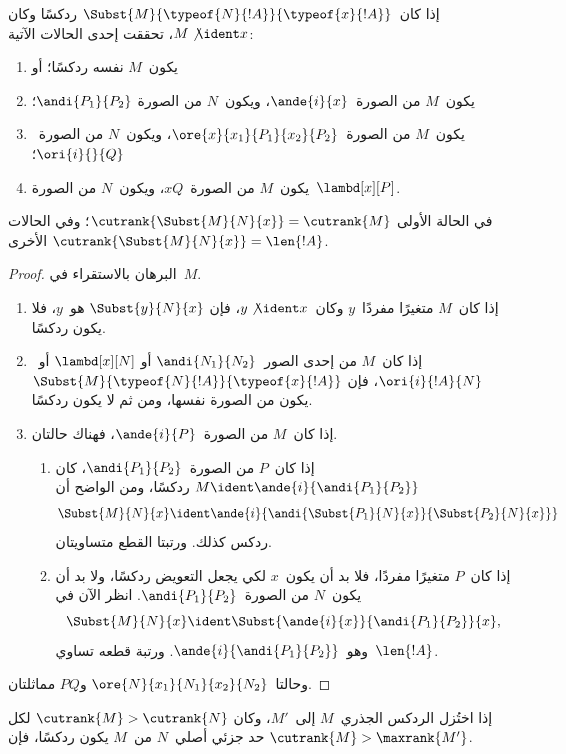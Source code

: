 \documentclass[../../../include/open-logic-section]{subfiles}
\begin{document}
\begin{lem}
  إذا كان~$\Subst{M}{\typeof{N}{!A}}{\typeof{x}{!A}}$ ردكسًا وكان
  $M\not\ident x$، تحققت إحدى الحالات الآتية:
  \begin{enumerate}
  \item يكون~$M$ نفسه ردكسًا؛ أو
  \item يكون~$M$ من الصورة~$\ande{i}{x}$، ويكون~$N$ من الصورة
    $\andi{P_1}{P_2}$؛
  \item يكون~$M$ من الصورة~$\ore{x}{x_1}{P_1}{x_2}{P_2}$، ويكون~$N$
    من الصورة~$\ori{i}{}{Q}$؛
  \item يكون~$M$ من الصورة~$xQ$، ويكون~$N$ من الصورة~$\lambd[x][P]$.
  \end{enumerate}
  في الحالة الأولى
  $\cutrank{\Subst{M}{N}{x}}=\cutrank{M}$؛ وفي الحالات الأخرى
  $\cutrank{\Subst{M}{N}{x}}=\len{!A}$.
\end{lem}
\begin{proof}
  البرهان بالاستقراء في~$M$.
  \begin{enumerate}
  \item إذا كان~$M$ متغيرًا مفردًا~$y$ وكان~$y\not\ident x$، فإن
    $\Subst{y}{N}{x}$ هو~$y$، فلا يكون ردكسًا.
  \item إذا كان~$M$ من إحدى الصور~$\andi{N_1}{N_2}$ أو
    $\lambd[x][N]$ أو~$\ori{i}{!A}{N}$، فإن
    $\Subst{M}{\typeof{N}{!A}}{\typeof{x}{!A}}$ يكون من الصورة نفسها،
    ومن ثم لا يكون ردكسًا.
  \item إذا كان~$M$ من الصورة~$\ande{i}{P}$، فهناك حالتان.
    \begin{enumerate}
      \item إذا كان~$P$ من الصورة~$\andi{P_1}{P_2}$، كان
        $M\ident\ande{i}{\andi{P_1}{P_2}}$ ردكسًا، ومن الواضح أن
        \[
        \Subst{M}{N}{x}\ident
        \ande{i}{\andi{\Subst{P_1}{N}{x}}{\Subst{P_2}{N}{x}}}
        \]
        ردكس كذلك. ورتبتا القطع متساويتان.
      \item إذا كان~$P$ متغيرًا مفردًا، فلا بد أن يكون~$x$ لكي يجعل
        التعويض ردكسًا، ولا بد أن يكون~$N$ من الصورة~$\andi{P_1}{P_2}$.
        انظر الآن في
        \[
        \Subst{M}{N}{x}\ident
        \Subst{\ande{i}{x}}{\andi{P_1}{P_2}}{x},
        \]
        وهو~$\ande{i}{\andi{P_1}{P_2}}$. ورتبة قطعه تساوي~$\len{!A}$.
    \end{enumerate}
  \end{enumerate}
  وحالتا~$\ore{N}{x_1}{N_1}{x_2}{N_2}$ و$PQ$ مماثلتان.
\end{proof}

\begin{lem}
  إذا اختُزل الردكس الجذري~$M$ إلى~$M'$، وكان
  $\cutrank{M}>\cutrank{N}$ لكل حد جزئي أصلي~$N$ من~$M$ يكون ردكسًا، فإن
  $\cutrank{M}>\maxrank{M'}$.
\end{lem}
\end{document}
